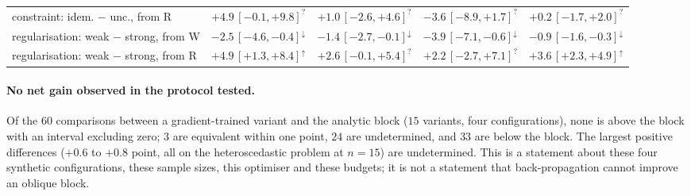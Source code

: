 \documentclass[11pt,a4paper]{article}
\theoremstyle{plain}
\theoremstyle{definition}
\theoremstyle{remark}
\begin{document}
\begin{table}[h]
{\begin{tabular}{@{}lrrrr@{}}
constraint: idem. $-$ unc., from R & $+4.9\,[-0.1,+9.8]^{?}$ & $+1.0\,[-2.6,+4.6]^{?}$ & $-3.6\,[-8.9,+1.7]^{?}$ & $+0.2\,[-1.7,+2.0]^{?}$ \\
regularisation: weak $-$ strong, from W & $-2.5\,[-4.6,-0.4]^{\downarrow}$ & $-1.4\,[-2.7,-0.1]^{\downarrow}$ & $-3.9\,[-7.1,-0.6]^{\downarrow}$ & $-0.9\,[-1.6,-0.3]^{\downarrow}$ \\
regularisation: weak $-$ strong, from R & $+4.9\,[+1.3,+8.4]^{\uparrow}$ & $+2.6\,[-0.1,+5.4]^{?}$ & $+2.2\,[-2.7,+7.1]^{?}$ & $+3.6\,[+2.3,+4.9]^{\uparrow}$ \\
\bottomrule
\end{tabular}}
\end{table}

\paragraph{No net gain observed in the protocol tested.} Of the $60$
comparisons between a gradient-trained variant and the analytic block
($15$ variants, four configurations), none is above the block with an
interval excluding zero; $3$ are equivalent within one point, $24$ are
undetermined, and $33$ are below the block. The largest positive
differences ($+0.6$ to $+0.8$ point, all on the heteroscedastic problem at
$n=15$) are undetermined. This is a statement about
these four synthetic configurations, these sample sizes, this optimiser and
these budgets; it is not a statement that back-propagation cannot improve
an oblique block.
\end{document}
